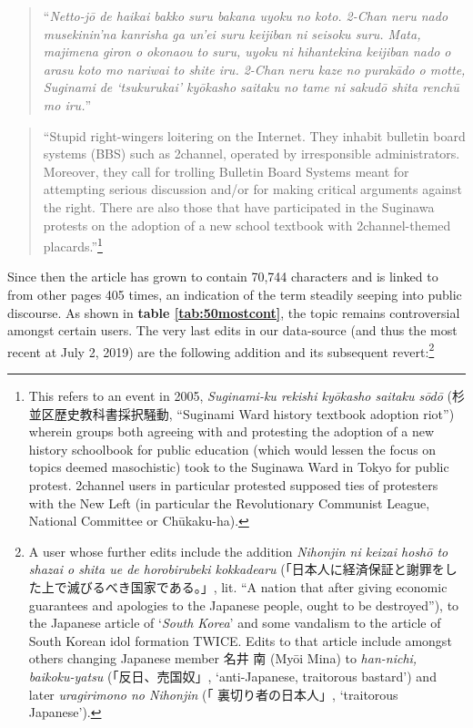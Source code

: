 \documentclass[10pt,british,A4paper,twoside]{memoir}
\begin{document}
\begin{quote}
``\emph{Netto-jō de haikai bakko suru bakana uyoku no koto. 2-Chan neru
nado musekinin'na kanrisha ga un'ei suru keijiban ni seisoku suru. Mata,
majimena giron o okonaou to suru, uyoku ni hihantekina keijiban nado o
arasu koto mo nariwai to shite iru. 2-Chan neru kaze no purakādo o
motte, Suginami de `tsukurukai' kyōkasho saitaku no tame ni sakudō shita
renchū mo iru.}''
\end{quote}

\begin{quote}
``Stupid right-wingers loitering on the Internet. They inhabit bulletin
board systems (BBS) such as 2channel, operated by irresponsible
administrators. Moreover, they call for trolling Bulletin Board Systems
meant for attempting serious discussion and/or for making critical
arguments against the right. There are also those that have participated
in the Suginawa protests on the adoption of a new school textbook with
2channel-themed placards.''\footnote{This refers to an event in 2005,
  \emph{Suginami-ku rekishi kyōkasho saitaku sōdō}
  (杉並区歴史教科書採択騒動, ``Suginami Ward history textbook adoption
  riot'') wherein groups both agreeing with and protesting the adoption
  of a new history schoolbook for public education (which would lessen
  the focus on topics deemed masochistic) took to the Suginawa Ward in
  Tokyo for public protest. 2channel users in particular protested
  supposed ties of protesters with the New Left (in particular the
  Revolutionary Communist League, National Committee or Chūkaku-ha).}
\end{quote}

Since then the article has grown to contain 70,744 characters and is
linked to from other pages 405 times, an indication of the term steadily
seeping into public discourse. As shown in \textbf{table
\ref{tab:50mostcont}}, the topic remains controversial amongst certain
users. The very last edits in our data-source (and thus the most recent
at July 2, 2019) are the following addition and its subsequent
revert:\footnote{A user whose further edits include the addition
  \emph{Nihonjin ni keizai hoshō to shazai o shita ue de horobirubeki
  kokkadearu}
  (「日本人に経済保証と謝罪をした上で滅びるべき国家である。」, lit. ``A
  nation that after giving economic guarantees and apologies to the
  Japanese people, ought to be destroyed''), to the Japanese article of
  `\emph{South Korea}' and some vandalism to the article of South Korean
  idol formation TWICE. Edits to that article include amongst others
  changing Japanese member 名井 南 (Myōi Mina) to \emph{han-nichi,
  baikoku-yatsu} (「反日、売国奴」, `anti-Japanese, traitorous bastard')
  and later \emph{uragirimono no Nihonjin} (「 裏切り者の日本人」,
  `traitorous Japanese').}
\end{document}
